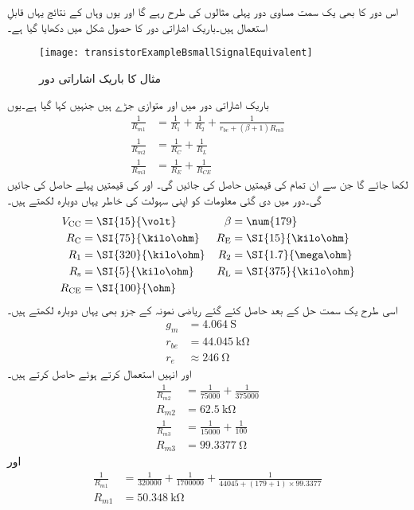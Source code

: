 اس دور کا بھی یک سمت مساوی دور پہلی مثالوں کی طرح رہے گا اور یوں وہاں کے نتائج یہاں قابلِ استعمال ہیں۔باریک اشاراتی دور کا حصول شکل   میں دکھایا گیا ہے۔
\begin{figure}
\centering
\texttt{[image: transistorExampleBsmallSignalEquivalent]}
\caption{مثال کا باریک اشاراتی دور}
\label{شکل_مثال_ب_کا_باریک_اشاراتی_دور}
\end{figure}
باریک اشاراتی دور میں  اور  متوازی جڑے ہیں جنہیں   کہا گیا ہے۔یوں
\begin{align*}
\frac{1}{R_{m1}}&=\frac{1}{R_1}+\frac{1}{R_2}+\frac{1}{r_{be}+\left(\beta+1 \right )R_{m3}}\\
\frac{1}{R_{m2}}&=\frac{1}{R_C}+\frac{1}{R_L}\\
\frac{1}{R_{m3}}&=\frac{1}{R_E}+\frac{1}{R_{CE}}
\end{align*}
لکھا جائے گا جن سے ان تمام کی قیمتیں حاصل کی جائیں گی۔  اور  کی قیمتیں پہلے حاصل کی جائیں گی۔دور میں دی گئی معلومات کو اپنی سہولت کی خاطر یہاں دوبارہ لکھتے ہیں۔
\begin{align*} 
V_{\textup{CC}} &=\SI{15}{\volt} & \beta&=\num{179}\\ 
R_{\textup{C}} &=\SI{75}{\kilo \ohm} &  R_{\textup{E}} &=\SI{15}{\kilo \ohm}\\ 
R_{\textup{1}} &=\SI{320}{\kilo \ohm} & R_{\textup{2}} &=\SI{1.7}{\mega \ohm}\\ 
R_{\textup{s}} &=\SI{5}{\kilo \ohm} & R_{\textup{L}} &=\SI{375}{\kilo \ohm} \\
R_{\textup{CE}}&=\SI{100}{\ohm}
\end{align*}
اسی طرح  یک سمت حل کے بعد حاصل کئے گئے ریاضی نمونہ  کے جزو بھی یہاں دوبارہ لکھتے ہیں۔
\begin{align*}
g_m&=\SI{4.064}{\siemens}\\
r_{be}&=\SI{44.045}{\kilo \ohm} \\
r_e & \approx \SI{246}{ \ohm}
\end{align*}
اور انہیں استعمال کرتے ہوئے حاصل کرتے ہیں۔
\begin{align*}
\frac{1}{R_{m2}}&=\frac{1}{75000} +\frac{1}{375000}\\
R_{m2}&=\SI{62.5}{\kilo \ohm}\\
\frac{1}{R_{m3}}&=\frac{1}{15000}+\frac{1}{100}\\
R_{m3}&=\SI{99.3377}{\ohm}
\end{align*}
اور
\begin{align*}
\frac{1}{R_{m1}}&=\frac{1}{320000}+\frac{1}{1700000}+\frac{1}{44045+(179+1) \times 99.3377}\\
R_{m1}&=\SI{50.348}{\kilo \ohm}
\end{align*}
